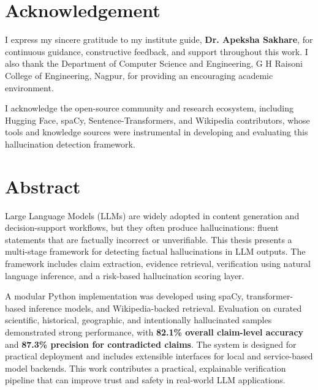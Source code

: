 \documentclass[12pt,a4paper]{report}
\begin{document}
\chapter*{Acknowledgement}
I express my sincere gratitude to my institute guide, \textbf{Dr. Apeksha Sakhare},
for continuous guidance, constructive feedback, and support throughout this work.
I also thank the Department of Computer Science and Engineering, G H Raisoni College of Engineering,
Nagpur, for providing an encouraging academic environment.

I acknowledge the open-source community and research ecosystem, including Hugging Face,
spaCy, Sentence-Transformers, and Wikipedia contributors, whose tools and knowledge sources
were instrumental in developing and evaluating this hallucination detection framework.


\chapter*{Abstract}
Large Language Models (LLMs) are widely adopted in content generation and decision-support workflows,
but they often produce hallucinations: fluent statements that are factually incorrect or unverifiable.
This thesis presents a multi-stage framework for detecting factual hallucinations in LLM outputs.
The framework includes claim extraction, evidence retrieval, verification using natural language
inference, and a risk-based hallucination scoring layer.

A modular Python implementation was developed using spaCy, transformer-based inference models,
and Wikipedia-backed retrieval. Evaluation on curated scientific, historical, geographic,
and intentionally hallucinated samples demonstrated strong performance, with
\textbf{82.1\% overall claim-level accuracy} and \textbf{87.3\% precision for contradicted claims}.
The system is designed for practical deployment and includes extensible interfaces for local
and service-based model backends. This work contributes a practical, explainable verification
pipeline that can improve trust and safety in real-world LLM applications.
\end{document}
